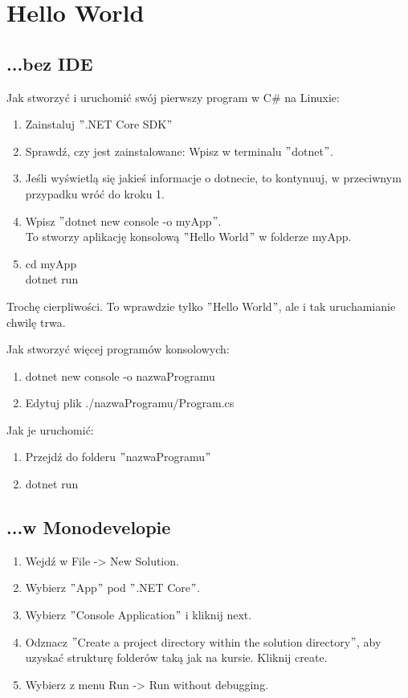 \documentclass[10pt]{article}
\begin{document}
\section{Hello World}

\subsection{...bez IDE}

Jak stworzyć i uruchomić swój pierwszy program w C\# na Linuxie:
\begin{enumerate}
\item Zainstaluj $"$.NET Core SDK$"$
\item Sprawdź, czy jest zainstalowane: Wpisz w terminalu $"$dotnet$"$.
\item Jeśli wyświetlą się jakieś informacje o dotnecie, to kontynuuj, w przeciwnym przypadku wróć do kroku 1.
\item Wpisz $"$dotnet new console -o myApp$"$.\\
To stworzy aplikację konsolową $"$Hello World$"$ w folderze myApp.
\item cd myApp\\
dotnet run
\end{enumerate}
Trochę cierpliwości. To wprawdzie tylko $"$Hello World$"$, ale i tak uruchamianie chwilę trwa.

Jak stworzyć więcej programów konsolowych:
\begin{enumerate}
\item dotnet new console -o nazwaProgramu
\item Edytuj plik ./nazwaProgramu/Program.cs
\end{enumerate}

Jak je uruchomić:
\begin{enumerate}
\item Przejdź do folderu $"$nazwaProgramu$"$
\item dotnet run
\end{enumerate}

\subsection{...w Monodevelopie}

\begin{enumerate}
\item Wejdź w File -> New Solution.
\item Wybierz $"$App$"$ pod $"$.NET Core$"$.
\item Wybierz $"$Console Application$"$ i kliknij next.
\item Odznacz $"$Create a project directory within the solution directory$"$, aby uzyskać strukturę folderów taką jak na kursie. Kliknij create.
\item Wybierz z menu Run -> Run without debugging.
\end{enumerate}
\end{document}
